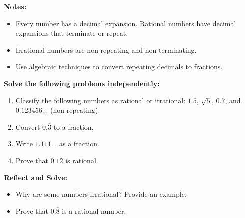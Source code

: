 \documentclass[12pt]{article}
\begin{document}
\begin{tcolorbox}[colframe=black!40, colback=gray!5, 
coltitle=black, colbacktitle=black!20, fonttitle=\bfseries\Large, 
title=Additional Notes, halign title=center, left=5pt, right=5pt, top=5pt, bottom=15pt]
\textbf{Notes:}
\begin{itemize}
    \item Every number has a decimal expansion. Rational numbers have decimal expansions that terminate or repeat.
    \item Irrational numbers are non-repeating and non-terminating.
    \item Use algebraic techniques to convert repeating decimals to fractions.
\end{itemize}
\end{tcolorbox}

\begin{tcolorbox}[colframe=black!60, colback=white, 
coltitle=black, colbacktitle=black!15, fonttitle=\bfseries\Large, 
title=Independent Practice, halign title=center, left=10pt, right=10pt, top=10pt, bottom=15pt]
\textbf{Solve the following problems independently:}
\begin{enumerate}[itemsep=3em]
    \item Classify the following numbers as rational or irrational: \(1.5\), \(\sqrt{5}\), \(0.\overline{7}\), and \(0.123456...\) (non-repeating).
    \item Convert \(0.\overline{3}\) to a fraction.
    \item Write \(1.111...\) as a fraction.
    \item Prove that \(0.\overline{12}\) is rational.
\end{enumerate}
\end{tcolorbox}

\begin{tcolorbox}[colframe=black!60, colback=white, 
coltitle=black, colbacktitle=black!15, fonttitle=\bfseries\Large, 
title=Exit Ticket, halign title=center, left=10pt, right=10pt, top=10pt, bottom=15pt]
\textbf{Reflect and Solve:}
\begin{itemize}
    \item Why are some numbers irrational? Provide an example.
    \item Prove that \(0.\overline{8}\) is a rational number.
\end{itemize}
\end{tcolorbox}
\end{document}
